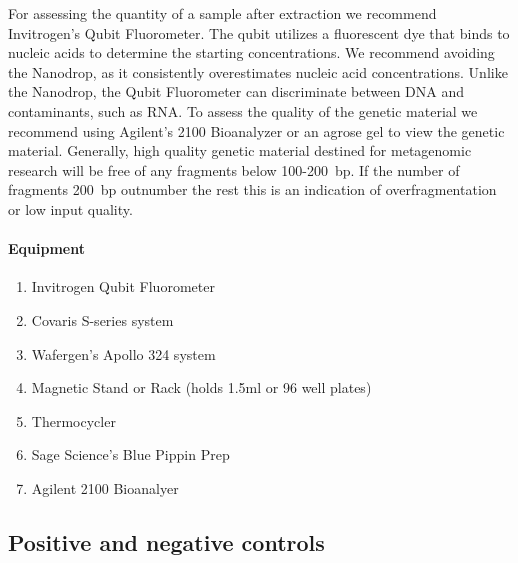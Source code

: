 \documentclass[graybox]{svmult}
\begin{document}
For assessing the quantity of a sample after extraction we recommend Invitrogen’s Qubit Fluorometer. The qubit utilizes a fluorescent dye that binds to nucleic acids to determine the starting concentrations.  We recommend avoiding the Nanodrop, as it consistently overestimates nucleic acid concentrations. Unlike the Nanodrop, the Qubit Fluorometer can discriminate between DNA and contaminants, such as RNA.
%
To assess the quality of the genetic material we recommend using Agilent’s 2100 Bioanalyzer or an agrose gel to view the genetic material. Generally, high quality genetic material destined for metagenomic research will be free of any fragments below 100-200~bp.  If the number of fragments 200~bp outnumber the rest this is an indication of overfragmentation or low input quality.


\paragraph{Equipment}
\begin{svgraybox}
\begin{enumerate}
\item{    Invitrogen Qubit Fluorometer}
\item{      Covaris S-series system}
\item{      Wafergen’s Apollo 324 system}
\item{      Magnetic Stand or Rack (holds 1.5ml or 96 well plates)}
\item{      Thermocycler}
\item{      Sage Science’s Blue Pippin Prep}
\item{      Agilent 2100 Bioanalyer}
\end{enumerate}
\end{svgraybox}

\subsection{Positive and negative controls }
\end{document}
